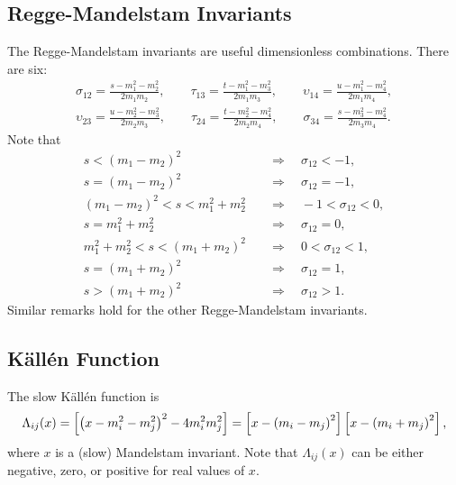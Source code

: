 \subsection{Regge-Mandelstam Invariants}
The Regge-Mandelstam invariants are useful dimensionless combinations. There are six:
\begin{align}
	\sigma_{12} = \frac{s - m_{1}^{2} - m_{2}^{2}}{2 m_{1} m_{2}}, \qquad \tau_{13} = \frac{t - m_{1}^{2} - m_{3}^{2}}{2 m_{1} m_{3}}, \qquad \upsilon_{14} = \frac{u - m_{1}^{2} - m_{4}^{2}}{2 m_{1} m_{4}}, \\
	\upsilon_{23} = \frac{u - m_{2}^{2} - m_{3}^{2}}{2 m_{2} m_{3}}, \qquad \tau_{24} = \frac{t - m_{2}^{2} - m_{4}^{2}}{2 m_{2} m_{4}}, \qquad \sigma_{34} = \frac{s - m_{3}^{2} - m_{4}^{2}}{2 m_{3} m_{4}}.
\end{align}
Note that
\begin{align}
	s < \left( m_{1} - m_{2} \right)^{2} \quad &\Longrightarrow \quad \sigma_{12} < -1, \\
	s = \left( m_{1} - m_{2} \right)^{2} \quad &\Longrightarrow \quad \sigma_{12} = -1, \\
	\left( m_{1} - m_{2} \right)^{2} < s < m_{1}^{2} + m_{2}^{2} \quad &\Longrightarrow \quad -1 < \sigma_{12} < 0, \\
	s = m_{1}^{2} + m_{2}^{2} \quad &\Longrightarrow \quad \sigma_{12} = 0, \\
	m_{1}^{2} + m_{2}^{2} < s < \left( m_{1} + m_{2} \right)^{2} \quad &\Longrightarrow \quad 0 < \sigma_{12} < 1, \\
	s = \left( m_{1} + m_{2} \right)^{2} \quad &\Longrightarrow \quad \sigma_{12} = 1, \\
	s > \left( m_{1} + m_{2} \right)^{2} \quad &\Longrightarrow \quad \sigma_{12} > 1.
\end{align}
Similar remarks hold for the other Regge-Mandelstam invariants.
\subsection{K\"{a}ll\'{e}n Function}
The slow K\"{a}ll\'{e}n function is
\begin{equation}
	\Lambda_{ij}(x) = \left[ \left(x - m_{i}^{2} - m_{j}^{2} \right)^{2} - 4 m_{i}^{2} m_{j}^{2} \right] = \left[ x - \left( m_{i} - m_{j} \right)^{2} \right] \left[ x - \left( m_{i} + m_{j} \right)^{2} \right],
\end{equation}
where $x$ is a (slow) Mandelstam invariant. Note that $\Lambda_{ij}(x)$ can be either negative, zero, or positive for real values of $x$.

